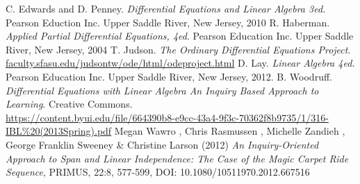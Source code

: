 \documentclass[12pt,oneside]{book}
\theoremstyle{definition}
\begin{document}
\begin{thebibliography}{99}
         C. Edwards and D. Penney. {\it Differential Equations and Linear Algebra
        3ed.} Pearson Eduction Inc.  Upper Saddle River, New Jersey, 2010
         R. Haberman. {\it Applied Partial Differential Equations,
        4ed}.  Pearson Education Inc. Upper Saddle River, New Jersey, 2004
         T. Judson. {\it The Ordinary Differential Equations Project}.
        \href{http://faculty.sfasu.edu/judsontw/ode/html/odeproject.html}{faculty.sfasu.edu/judsontw/ode/html/odeproject.html}
         D. Lay. {\it Linear Algebra 4ed.} Pearson Education Inc. Upper
        Saddle River, New Jersey, 2012.
         B. Woodruff. {\it Differential Equations with Linear Algebra An
        Inquiry Based Approach to Learning}. Creative Commons.
        \\\href{https://content.byui.edu/file/664390b8-e9cc-43a4-9f3c-70362f8b9735/1/316-IBL\%20(2013Spring).pdf}{https://content.byui.edu/file/664390b8-e9cc-43a4-9f3c-70362f8b9735/1/316-IBL\%20(2013Spring).pdf}
         Megan Wawro , Chris Rasmussen , Michelle Zandieh , George
        Franklin Sweeney \& Christine Larson (2012) {\it An Inquiry-Oriented Approach to Span
        and Linear Independence: The Case of the Magic Carpet Ride Sequence}, PRIMUS, 22:8,
        577-599, DOI: 10.1080/10511970.2012.667516
\end{thebibliography}
\end{document}
